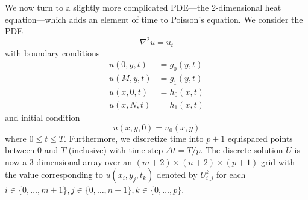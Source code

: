 \documentclass[conference]{IEEEtran}
\begin{document}
We now turn to a slightly more complicated PDE---the 2-dimensional heat equation---which adds an element of time to Poisson's equation. We consider the PDE
\begin{equation}
  \nabla^2 u = u_t
\end{equation}
with boundary conditions
\begin{align}
  u(0, y, t) &= g_0(y, t) \\
  u(M, y, t) &= g_1(y, t) \\
  u(x, 0, t) &= h_0(x, t) \\
  u(x, N, t) &= h_1(x, t)
\end{align}
and initial condition
\begin{equation}
  u(x, y, 0) = u_0(x, y)
\end{equation}
where $0 \le t \le T$. Furthermore, we discretize time into $p+1$ equispaced points between $0$ and $T$ (inclusive) with time step $\Delta t = T/p$. The discrete solution $U$ is now a 3-dimensional array over an $(m+2) \times (n+2) \times (p+1)$ grid with the value corresponding to $u(x_i, y_j, t_k)$ denoted by $U_{i,j}^k$ for each $i \in \{0,\ldots,m+1\}, j \in \{0,\ldots,n+1\}, k \in \{0,\ldots,p\}$.
\end{document}
